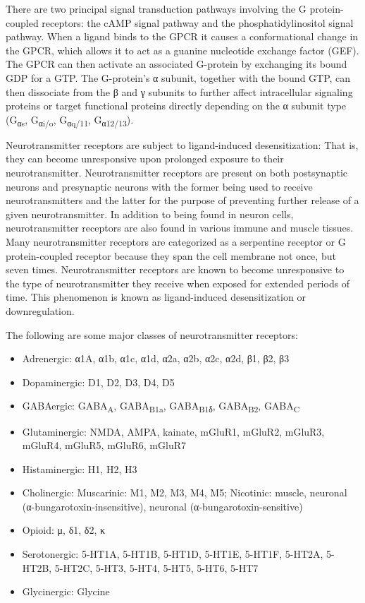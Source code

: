 There are two principal signal transduction pathways involving the G protein-coupled receptors: the cAMP signal pathway and the phosphatidylinositol signal pathway. When a ligand binds to the GPCR it causes a conformational change in the GPCR, which allows it to act as a guanine nucleotide exchange factor (GEF). The GPCR can then activate an associated G-protein by exchanging its bound GDP for a GTP. The G-protein's α subunit, together with the bound GTP, can then dissociate from the β and γ subunits to further affect intracellular signaling proteins or target functional proteins directly depending on the α subunit type (G\textsubscript{αs}, G\textsubscript{αi/o}, G\textsubscript{αq/11}, G\textsubscript{α12/13}).

Neurotransmitter receptors are subject to ligand-induced desensitization: That is, they can become unresponsive upon prolonged exposure to their neurotransmitter. Neurotransmitter receptors are present on both postsynaptic neurons and presynaptic neurons with the former being used to receive neurotransmitters and the latter for the purpose of preventing further release of a given neurotransmitter. In addition to being found in neuron cells, neurotransmitter receptors are also found in various immune and muscle tissues. Many neurotransmitter receptors are categorized as a serpentine receptor or G protein-coupled receptor because they span the cell membrane not once, but seven times. Neurotransmitter receptors are known to become unresponsive to the type of neurotransmitter they receive when exposed for extended periods of time. This phenomenon is known as ligand-induced desensitization or downregulation.

The following are some major classes of neurotransmitter receptors:

\begin{itemize}
\tightlist
\item
  Adrenergic: α1A, α1b, α1c, α1d, α2a, α2b, α2c, α2d, β1, β2, β3
\item
  Dopaminergic: D1, D2, D3, D4, D5
\item
  GABAergic: GABA\textsubscript{A}, GABA\textsubscript{B1a}, GABA\textsubscript{B1δ}, GABA\textsubscript{B2}, GABA\textsubscript{C}
\item
  Glutaminergic: NMDA, AMPA, kainate, mGluR1, mGluR2, mGluR3, mGluR4, mGluR5, mGluR6, mGluR7
\item
  Histaminergic: H1, H2, H3
\item
  Cholinergic: Muscarinic: M1, M2, M3, M4, M5; Nicotinic: muscle, neuronal (α-bungarotoxin-insensitive), neuronal (α-bungarotoxin-sensitive)
\item
  Opioid: μ, δ1, δ2, κ
\item
  Serotonergic: 5-HT1A, 5-HT1B, 5-HT1D, 5-HT1E, 5-HT1F, 5-HT2A, 5-HT2B, 5-HT2C, 5-HT3, 5-HT4, 5-HT5, 5-HT6, 5-HT7
\item
  Glycinergic: Glycine
\end{itemize}

